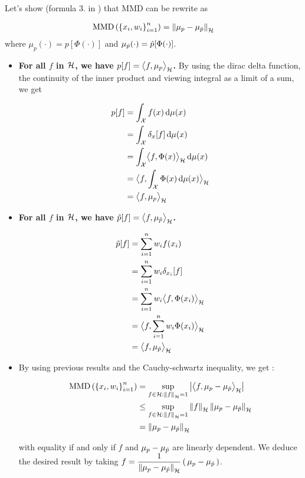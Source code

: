  Let's show (formula 3. in \cite{FWBQ}) that MMD can be rewrite as
 \begin{boxtheorem}
   \begin{align}
     \operatorname { MMD } \left( \left\{ x _ { i } , w _ { i } \right\} _ { i = 1 } ^ { n } \right) = \left\| \mu _ { p } - \mu _ { \hat { p } } \right\| _ { \mathcal { H } }
   \end{align}
   where $\mu_p(\cdot) = p[\Phi(\cdot)]$ and $\mu_{\hat{p}}(\cdot) = \hat{p}[\Phi(\cdot)]$.
 \end{boxtheorem}

   \begin{itemize}[leftmargin=*, font= \color{blue} \large, label= $\bullet$]
     \item \textbf{For all $f$ in $\mathcal{H}$, we have $p[f] = \bigl \langle f , \mu_p \bigr \rangle_{\mathcal{H}}$.} By using
     the dirac delta function, the continuity of the inner product and viewing integral
     as a limit of a sum, we get
     \begin{boxitemize}
     \begin{align*}
       p[f] &= \int_{\X} f(x) \d \mu(x)\\
       &= \int_{\X} \delta_x[f]  \d \mu(x)\\
       &= \int_{\X} \bigps{f}{\Phi(x)}  \d \mu(x)\\%
       &=  \bigps{f}{\int_{\X} \Phi(x) \d \mu(x)} \\
       &= \bigps{f}{\mu_p}
     \end{align*}
      \end{boxitemize}
     \item \textbf{For all $f$ in $\mathcal{H}$, we have $\hat{p}[f] = \bigl \langle f , \mu_{\hat{p}} \bigr \rangle_{\mathcal{H}}$.}
     \begin{boxitemize}
     \begin{align*}
       \p[f] &= \sum_{i=1}^n w_i f(x_i)\\
       &= \sum_{i=1}^n w_i \delta_{x_i}[f]\\
       &= \sum_{i=1}^n w_i \bigps{f}{\Phi(x_i)}\\%
       &=  \bigps{f}{\sum_{i=1}^n w_i \Phi(x_i)} \\
       &= \bigps{f}{\mu_{\p}}
     \end{align*}
   \end{boxitemize}
\item By using previous results and the Cauchy-schwartz inequality, we get :
\begin{boxitemize}
\begin{align*}
\MMD &= \sup _ { f \in \H : \norme{f} = 1 } \abs{
\bigps{f}{\mu_{p}-\mu_{\p}} }\\
&\leq \sup _ { f \in \H : \norme{f} = 1 } \norme{f} \norme{\mu_{p}-\mu_{\p}}\\
&= \norme{\mu_{p}-\mu_{\p}}
\end{align*}
 \end{boxitemize}
with equality if and only if $f$ and  $\mu_{p}-\mu_{\hat{p}}$ are linearly dependent.
We deduce the desired result by taking $ \displaystyle f = \frac{1}{\norme{\mu_{p}-\mu_{\p}}}\prt{\mu_{p}-\mu_{\p}}$.

   \end{itemize}



